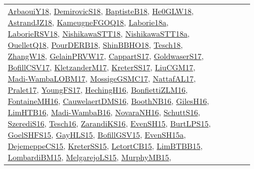 {\begin{longtable}{lp{3cm}>{\raggedright}p{6cm}>{\raggedright}p{6cm}p{8cm}}
\href{papers/ArbaouiY18.pdf}{ArbaouiY18}\cite{ArbaouiY18}, \href{papers/DemirovicS18.pdf}{DemirovicS18}\cite{DemirovicS18}, \href{articles/BaptisteB18.pdf}{BaptisteB18}\cite{BaptisteB18}, \href{papers/He0GLW18.pdf}{He0GLW18}\cite{He0GLW18}, \href{papers/AstrandJZ18.pdf}{AstrandJZ18}\cite{AstrandJZ18}, \href{papers/KameugneFGOQ18.pdf}{KameugneFGOQ18}\cite{KameugneFGOQ18}, \href{papers/Laborie18a.pdf}{Laborie18a}\cite{Laborie18a}, \href{articles/LaborieRSV18.pdf}{LaborieRSV18}\cite{LaborieRSV18}, \href{papers/NishikawaSTT18.pdf}{NishikawaSTT18}\cite{NishikawaSTT18}, \href{papers/NishikawaSTT18a.pdf}{NishikawaSTT18a}\cite{NishikawaSTT18a}, \href{papers/OuelletQ18.pdf}{OuelletQ18}\cite{OuelletQ18}, \href{articles/PourDERB18.pdf}{PourDERB18}\cite{PourDERB18}, \href{articles/ShinBBHO18.pdf}{ShinBBHO18}\cite{ShinBBHO18}, \href{papers/Tesch18.pdf}{Tesch18}\cite{Tesch18}, \href{articles/ZhangW18.pdf}{ZhangW18}\cite{ZhangW18}, \href{papers/GelainPRVW17.pdf}{GelainPRVW17}\cite{GelainPRVW17}, \href{papers/CappartS17.pdf}{CappartS17}\cite{CappartS17}, \href{papers/GoldwaserS17.pdf}{GoldwaserS17}\cite{GoldwaserS17}, \href{papers/BofillCSV17.pdf}{BofillCSV17}\cite{BofillCSV17}, \href{papers/KletzanderM17.pdf}{KletzanderM17}\cite{KletzanderM17}, \href{articles/KreterSS17.pdf}{KreterSS17}\cite{KreterSS17}, \href{papers/LiuCGM17.pdf}{LiuCGM17}\cite{LiuCGM17}, \href{papers/Madi-WambaLOBM17.pdf}{Madi-WambaLOBM17}\cite{Madi-WambaLOBM17}, \href{papers/MossigeGSMC17.pdf}{MossigeGSMC17}\cite{MossigeGSMC17}, \href{articles/NattafAL17.pdf}{NattafAL17}\cite{NattafAL17}, \href{papers/Pralet17.pdf}{Pralet17}\cite{Pralet17}, \href{papers/YoungFS17.pdf}{YoungFS17}\cite{YoungFS17}, \href{papers/HechingH16.pdf}{HechingH16}\cite{HechingH16}, \href{papers/BonfiettiZLM16.pdf}{BonfiettiZLM16}\cite{BonfiettiZLM16}, \href{papers/FontaineMH16.pdf}{FontaineMH16}\cite{FontaineMH16}, \href{papers/CauwelaertDMS16.pdf}{CauwelaertDMS16}\cite{CauwelaertDMS16}, \href{papers/BoothNB16.pdf}{BoothNB16}\cite{BoothNB16}, \href{papers/GilesH16.pdf}{GilesH16}\cite{GilesH16}, \href{papers/LimHTB16.pdf}{LimHTB16}\cite{LimHTB16}, \href{papers/Madi-WambaB16.pdf}{Madi-WambaB16}\cite{Madi-WambaB16}, \href{articles/NovaraNH16.pdf}{NovaraNH16}\cite{NovaraNH16}, \href{papers/SchuttS16.pdf}{SchuttS16}\cite{SchuttS16}, \href{papers/SzerediS16.pdf}{SzerediS16}\cite{SzerediS16}, \href{papers/Tesch16.pdf}{Tesch16}\cite{Tesch16}, \href{articles/ZarandiKS16.pdf}{ZarandiKS16}\cite{ZarandiKS16}, \href{papers/EvenSH15.pdf}{EvenSH15}\cite{EvenSH15}, \href{papers/BurtLPS15.pdf}{BurtLPS15}\cite{BurtLPS15}, \href{articles/GoelSHFS15.pdf}{GoelSHFS15}\cite{GoelSHFS15}, \href{papers/GayHLS15.pdf}{GayHLS15}\cite{GayHLS15}, \href{papers/BofillGSV15.pdf}{BofillGSV15}\cite{BofillGSV15}, \href{articles/EvenSH15a.pdf}{EvenSH15a}\cite{EvenSH15a}, \href{papers/DejemeppeCS15.pdf}{DejemeppeCS15}\cite{DejemeppeCS15}, \href{papers/KreterSS15.pdf}{KreterSS15}\cite{KreterSS15}, \href{articles/LetortCB15.pdf}{LetortCB15}\cite{LetortCB15}, \href{papers/LimBTBB15.pdf}{LimBTBB15}\cite{LimBTBB15}, \href{papers/LombardiBM15.pdf}{LombardiBM15}\cite{LombardiBM15}, \href{papers/MelgarejoLS15.pdf}{MelgarejoLS15}\cite{MelgarejoLS15}, \href{papers/MurphyMB15.pdf}{MurphyMB15}\cite{MurphyMB15}, 
\end{longtable}}
